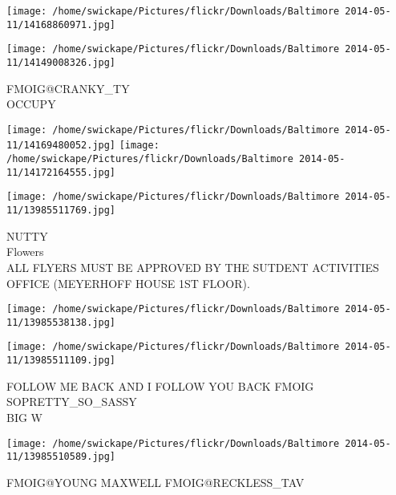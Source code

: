 \documentclass[10pt,letterpaper]{article}
\begin{document}
\texttt{[image: /home/swickape/Pictures/flickr/Downloads/Baltimore 2014-05-11/14168860971.jpg]}

\vspace{0.25in}
\texttt{[image: /home/swickape/Pictures/flickr/Downloads/Baltimore 2014-05-11/14149008326.jpg]}

FMOIG@CRANKY\_TY\\
OCCUPY
\pagebreak

\texttt{[image: /home/swickape/Pictures/flickr/Downloads/Baltimore 2014-05-11/14169480052.jpg]}
\texttt{[image: /home/swickape/Pictures/flickr/Downloads/Baltimore 2014-05-11/14172164555.jpg]}

\texttt{[image: /home/swickape/Pictures/flickr/Downloads/Baltimore 2014-05-11/13985511769.jpg]}

NUTTY\\
Flowers\\
ALL FLYERS MUST BE APPROVED BY THE SUTDENT ACTIVITIES OFFICE (MEYERHOFF HOUSE 1ST FLOOR).
\pagebreak

\texttt{[image: /home/swickape/Pictures/flickr/Downloads/Baltimore 2014-05-11/13985538138.jpg]}

\vspace{0.25in}
\texttt{[image: /home/swickape/Pictures/flickr/Downloads/Baltimore 2014-05-11/13985511109.jpg]}

FOLLOW ME BACK AND I FOLLOW YOU BACK FMOIG SOPRETTY\_SO\_SASSY\\
BIG W
\pagebreak

\texttt{[image: /home/swickape/Pictures/flickr/Downloads/Baltimore 2014-05-11/13985510589.jpg]}

FMOIG@YOUNG MAXWELL FMOIG@RECKLESS\_TAV
\pagebreak
\end{document}
